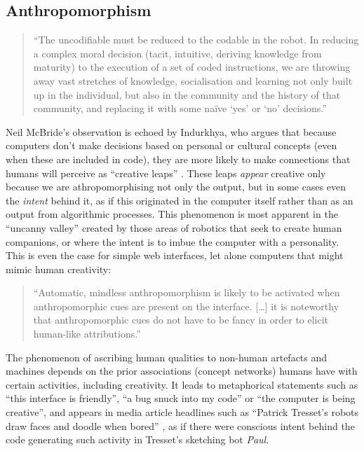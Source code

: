 \subsection{Anthropomorphism}
\label{ss:anthropomorphism}

\begin{quotation}
  ``The uncodifiable must be reduced to the codable in the robot. In reducing a complex moral decision (tacit, intuitive, deriving knowledge from maturity) to the execution of a set of coded instructions, we are throwing away vast stretches of knowledge, socialisation and learning not only built up in the individual, but also in the community and the history of that community, and replacing it with some na{\"i}ve `yes' or `no' decisions.'' 
\end{quotation}

Neil McBride's observation is echoed by Indurkhya, who argues that because computers don't make decisions based on personal or cultural concepts (even when these are included in code), they are more likely to make connections that humans will perceive as ``creative leaps'' \autocite{Indurkhya}. These leaps \textit{appear} creative only because we are athropomorphising not only the output, but in some cases even the \textit{intent} behind it, as if this originated in the computer itself rather than as an output from algorithmic processes. This phenomenon is most apparent in the ``uncanny valley'' created by those areas of robotics that seek to create human companions, or where the intent is to imbue the computer with a personality. This is even the case for simple web interfaces, let alone computers that might mimic human creativity:

\begin{quotation}
  ``Automatic, mindless anthropomorphism is likely to be activated when anthropomorphic cues are present on the interface. [\ldots] it is noteworthy that anthropomorphic cues do not have to be fancy in order to elicit human-like attributions.'' 
\end{quotation}

The phenomenon of ascribing human qualities to non-human artefacts and machines depends on the prior associations (concept networks) humans have with certain activities, including creativity. It leads to metaphorical statements such as ``this interface is friendly'', ``a bug snuck into my code'' or ``the computer is being creative'', and appears in media article headlines such as ``Patrick Tresset's robots draw faces and doodle when bored'' \autocite{Wired2011}, as if there were conscious intent behind the code generating such activity in Tresset's sketching bot \textit{Paul}.


